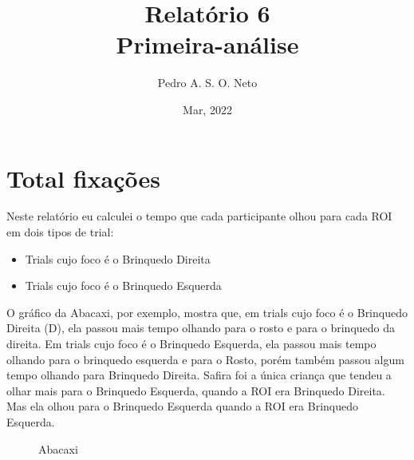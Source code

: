 \documentclass{article}
\title{Relatório 6 \\ Primeira-análise}
\author{Pedro A. S. O. Neto}
\date{Mar, 2022}
\begin{document}
\maketitle

\section{Total fixações}

Neste relatório eu calculei o tempo que cada participante olhou para cada ROI em dois tipos de trial: 

\begin{itemize}
  \item Trials cujo foco é o Brinquedo Direita
  \item Trials cujo foco é o Brinquedo Esquerda
\end{itemize}

O gráfico da Abacaxi, por exemplo, mostra que, em trials cujo foco é o Brinquedo Direita (D), ela passou mais tempo olhando para o rosto e para o brinquedo da direita. Em trials cujo foco é o Brinquedo Esquerda, ela passou mais tempo olhando para o brinquedo esquerda e para o Rosto, porém também passou algum tempo olhando para Brinquedo Direita.
Safira foi a única criança que tendeu a olhar mais para o Brinquedo Esquerda, quando a ROI era Brinquedo Direita. Mas ela olhou para o Brinquedo Esquerda quando a ROI era Brinquedo Esquerda.

\begin{figure}[t]
\caption{Abacaxi}
\noindent{}
\centering
\end{figure}
\end{document}
